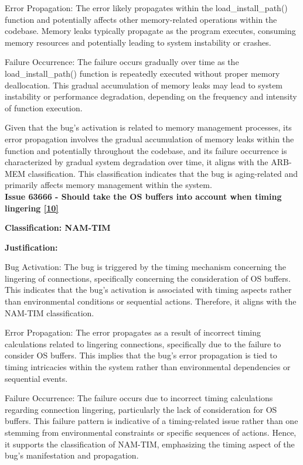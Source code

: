 \documentclass[12pt]{article}
\numberwithin{table}{section}
\begin{document}
	Error Propagation: The error likely propagates within the load\_install\_path() function and potentially affects other memory-related operations within the codebase. Memory leaks typically propagate as the program executes, consuming memory resources and potentially leading to system instability or crashes.
	
	Failure Occurrence: The failure occurs gradually over time as the load\_install\_path() function is repeatedly executed without proper memory deallocation. This gradual accumulation of memory leaks may lead to system instability or performance degradation, depending on the frequency and intensity of function execution.
	
	Given that the bug's activation is related to memory management processes, its error propagation involves the gradual accumulation of memory leaks within the function and potentially throughout the codebase, and its failure occurrence is characterized by gradual system degradation over time, it aligns with the ARB-MEM classification. This classification indicates that the bug is aging-related and primarily affects memory management within the system.\\
	
	\textbf{Issue 63666 - Should take the OS buffers into account when timing lingering \href{https://bz.apache.org/bugzilla/show_bug.cgi?id=63666}{[10]}}
	
	\textbf{Classification: NAM-TIM}
	
	\textbf{Justification:}
	
	Bug Activation: The bug is triggered by the timing mechanism concerning the lingering of connections, specifically concerning the consideration of OS buffers. This indicates that the bug's activation is associated with timing aspects rather than environmental conditions or sequential actions. Therefore, it aligns with the NAM-TIM classification.
	
	Error Propagation: The error propagates as a result of incorrect timing calculations related to lingering connections, specifically due to the failure to consider OS buffers. This implies that the bug's error propagation is tied to timing intricacies within the system rather than environmental dependencies or sequential events.
	
	Failure Occurrence: The failure occurs due to incorrect timing calculations regarding connection lingering, particularly the lack of consideration for OS buffers. This failure pattern is indicative of a timing-related issue rather than one stemming from environmental constraints or specific sequences of actions. Hence, it supports the classification of NAM-TIM, emphasizing the timing aspect of the bug's manifestation and propagation.\\
	
\end{document}
